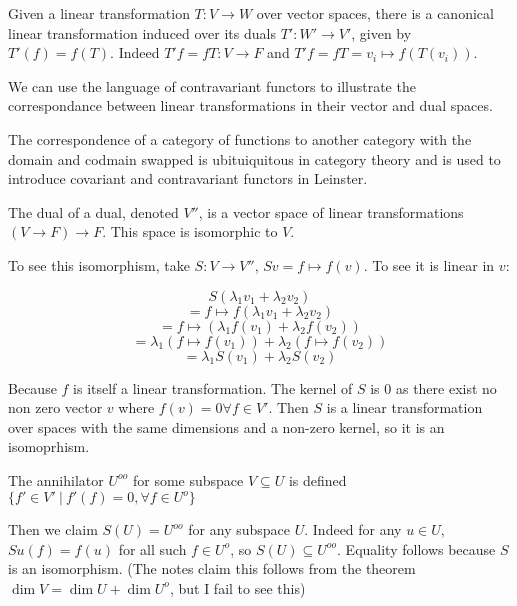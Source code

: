 \documentclass[10pt]{article}
\begin{document}
Given a linear transformation $T: V \to W$ over vector spaces, there is a
canonical linear transformation induced over its duals $T': W' \to V'$,
given by $T'(f) = f(T)$. Indeed $T'f = fT: V \to F$ and $T'f = fT = v_i \mapsto
f(T(v_i))$.

\begin{note}

We can use the language of contravariant functors to illustrate the
correspondance between linear transformations in their vector and dual spaces.


The correspondence of a category of functions to another category with the
domain and codmain swapped is ubituiquitous in category theory and is used to
introduce covariant and contravariant functors in Leinster. 


\end{note}

\begin{definition}
	The dual of a dual, denoted $V''$, is a vector space of linear
	transformations $(V \to F) \to F$. This space is isomorphic to $V$.
\end{definition}

To see this isomorphism, take $S: V \to V''$, $Sv = f \mapsto f(v)$.
To see it is linear in $v$:

\[S(\lambda_1 v_1 + \lambda_2 v_2)\] 
\[= f \mapsto f(\lambda_1 v_1 + \lambda_2 v_2)\]
\[= f \mapsto (\lambda_1 f(v_1) + \lambda_2 f(v_2))\]
\[= \lambda_1 (f \mapsto f(v_1)) + \lambda_2 (f \mapsto f(v_2))\]
\[= \lambda_1 S(v_1) + \lambda_2 S(v_2)\]

Because $f$ is itself a linear transformation. The kernel of $S$ is $0$ as
there exist no non zero vector $v$ where $f(v) = 0 \forall f \in V'$. Then $S$
is a linear transformation over spaces with the same dimensions and a non-zero
kernel, so it is an isomoprhism.

\begin{definition}
	The annihilator $U^{oo}$ for some subspace $V \subseteq U$ is defined $\{ f'
	\in V' ~|~ f'(f) = 0, \forall f \in U^o \}$
\end{definition}

Then we claim $S(U) = U^{oo}$ for any subspace $U$. Indeed for any $u \in U$,
$Su(f) = f(u)$ for all such $f \in U^o$, so $S(U) \subseteq U^{oo}$.
Equality follows because $S$ is an isomorphism. (The notes claim this follows
from the theorem $\dim V = \dim U + \dim U^o$, but I fail to see this)
\end{document}
